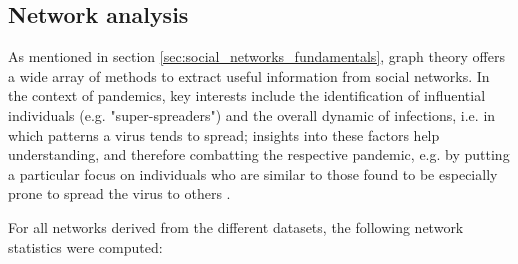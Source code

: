 \subsection{Network analysis}
\label{sec:social_networks_analysis}

As mentioned in section \ref{sec:social_networks_fundamentals}, graph theory offers a wide array of methods to extract useful information from social networks. In the context of pandemics, key interests include the identification of influential individuals (e.g. "super-spreaders") and the overall dynamic of infections, i.e. in which patterns a virus tends to spread; insights into these factors help understanding, and therefore combatting the respective pandemic, e.g. by putting a particular focus on individuals who are similar to those found to be especially prone to spread the virus to others .

For all networks derived from the different datasets, the following network statistics were computed:

